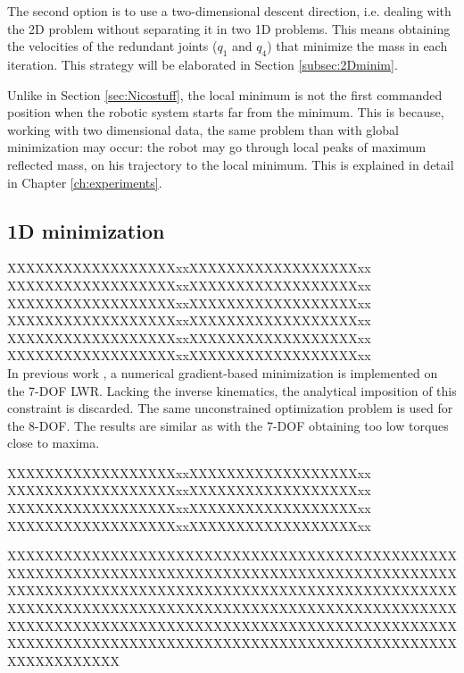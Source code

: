 The second option is to use a two-dimensional descent direction, i.e. dealing with the 2D problem without separating it in two 1D problems. This means obtaining the velocities of the redundant joints ($q_1$ and $q_4$) that minimize the mass in each iteration. This strategy will be elaborated in Section \ref{subsec:2Dminim}.





Unlike in Section \ref{sec:Nicostuff}, the local minimum is not the first commanded position when the robotic system starts far from the minimum. This is because, working with two dimensional data, the same problem than with global minimization may occur: the robot may go through local peaks of maximum reflected mass, on his trajectory to the local minimum. This is explained in detail in Chapter \ref{ch:experiments}.



\subsection{1D minimization}
\label{subsec:1Dminim}








XXXXXXXXXXXXXXXXXXxxXXXXXXXXXXXXXXXXXXxx  \\XXXXXXXXXXXXXXXXXXxxXXXXXXXXXXXXXXXXXXxx  \\XXXXXXXXXXXXXXXXXXxxXXXXXXXXXXXXXXXXXXxx  \\XXXXXXXXXXXXXXXXXXxxXXXXXXXXXXXXXXXXXXxx  \\XXXXXXXXXXXXXXXXXXxxXXXXXXXXXXXXXXXXXXxx  \\XXXXXXXXXXXXXXXXXXxxXXXXXXXXXXXXXXXXXXxx  \\
In previous work \cite{paper_iros2017}, a numerical gradient-based minimization is implemented on the 7-DOF LWR. Lacking the inverse kinematics, the analytical imposition of this constraint is discarded. The same unconstrained optimization problem is used for the 8-DOF. The results are similar as with the 7-DOF obtaining too low torques close to maxima.

XXXXXXXXXXXXXXXXXXxxXXXXXXXXXXXXXXXXXXxx  \\XXXXXXXXXXXXXXXXXXxxXXXXXXXXXXXXXXXXXXxx  \\XXXXXXXXXXXXXXXXXXxxXXXXXXXXXXXXXXXXXXxx  \\XXXXXXXXXXXXXXXXXXxxXXXXXXXXXXXXXXXXXXxx  \


XXXXXXXXXXXXXXXXXXXXXXXXXXXXXXXXXXXXXXXXXXXXXXXXXXXXXXXXXXXXXXXXXXXXXXXXXXXXXXXXXXXXXXXXXXXXXXXXXXXXXXXXXXXXXXXXXXXXXXXXXXXXXXXXXXXXXXXXXXXXXXXXXXXXXXXXXXXXXXXXXXXXXXXXXXXXXXXXXXXXXXXXXXXXXXXXXXXXXXXXXXXXXXXXXXXXXXXXXXXXXXXXXXXXXXXXXXXXXXXXXXXXXXXXXXXXXXXXXXXXXXXXXXXXXXXXXXXXXXXXXXXXXXXXXXXXXXXXXXXX

